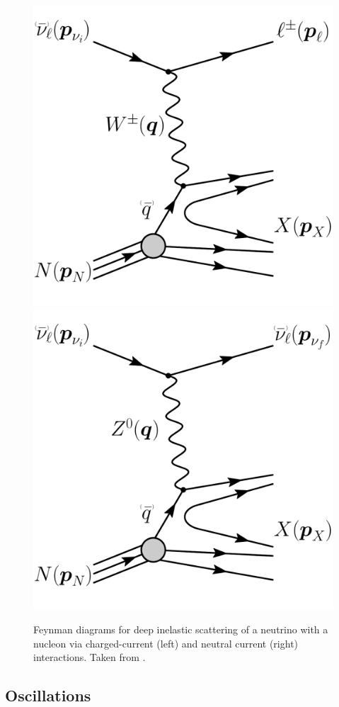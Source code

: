 \begin{figure}[h]
    \centering
    \includegraphics[width=0.4\linewidth]{figures/neutrinos_properties/feynman_DIS_CC_nu_new.pdf}
    \hspace{0.8cm}
    \includegraphics[width=0.4\linewidth]{figures/neutrinos_properties/feynman_DIS_NC_nu_new.pdf}
    \caption[Neutrino-nucleon deep inelastic scattering]{Feynman diagrams for deep inelastic scattering of a neutrino with a nucleon via charged-current (left) and neutral current (right) interactions. Taken from \cite{ATerliuk}.}
\end{figure}


\subsection{Oscillations} 




